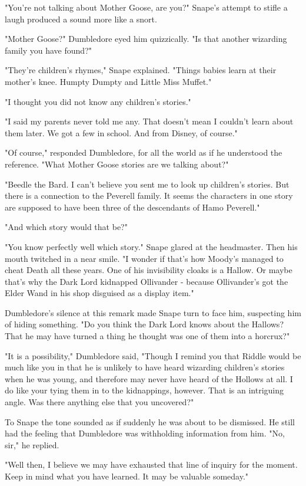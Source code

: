 \documentclass[a4paper,11pt]{article}
\begin{document}
"You're not talking about Mother Goose, are you?" Snape's attempt to stifle a laugh produced a sound more like a snort.

"Mother Goose?" Dumbledore eyed him quizzically. "Is that another wizarding family you have found?"

"They're children's rhymes," Snape explained. "Things babies learn at their mother's knee. Humpty Dumpty and Little Miss Muffet."

"I thought you did not know any children's stories."

"I said my parents never told me any. That doesn't mean I couldn't learn about them later. We got a few in school. And from Disney, of course."

"Of course," responded Dumbledore, for all the world as if he understood the reference. "What Mother Goose stories are we talking about?"

"Beedle the Bard. I can't believe you sent me to look up children's stories. But there is a connection to the Peverell family. It seems the characters in one story are supposed to have been three of the descendants of Hamo Peverell."

"And which story would that be?"

"You know perfectly well which story." Snape glared at the headmaster. Then his mouth twitched in a near smile. "I wonder if that's how Moody's managed to cheat Death all these years. One of his invisibility cloaks is a Hallow. Or maybe that's why the Dark Lord kidnapped Ollivander - because Ollivander's got the Elder Wand in his shop disguised as a display item."

Dumbledore's silence at this remark made Snape turn to face him, suspecting him of hiding something. "Do you think the Dark Lord knows about the Hallows? That he may have turned a thing he thought was one of them into a horcrux?"

"It is a possibility," Dumbledore said, "Though I remind you that Riddle would be much like you in that he is unlikely to have heard wizarding children's stories when he was young, and therefore may never have heard of the Hollows at all. I do like your tying them in to the kidnappings, however. That is an intriguing angle. Was there anything else that you uncovered?"

To Snape the tone sounded as if suddenly he was about to be dismissed. He still had the feeling that Dumbledore was withholding information from him. "No, sir," he replied.

"Well then, I believe we may have exhausted that line of inquiry for the moment. Keep in mind what you have learned. It may be valuable someday."
\end{document}
